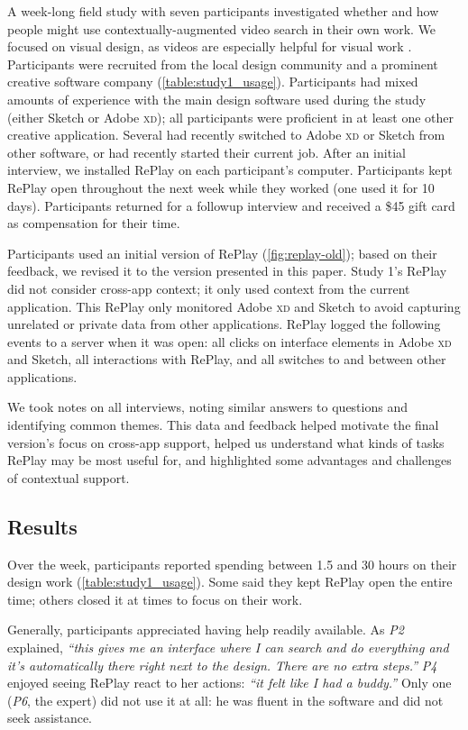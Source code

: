 A week-long field study with seven participants investigated whether and how people might use contextually-augmented video search in their own work. We focused on visual design, as videos are especially helpful for visual work \cite{Chi2012}.  Participants were recruited from the local design community and a prominent creative software company (\autoref{table:study1_usage}). Participants had mixed amounts of experience with the main design software used during the study (either Sketch or Adobe \textsc{xd}); all participants were proficient in at least one other creative application. Several had recently switched to Adobe \textsc{xd} or Sketch from other software, or had recently started their current job. After an initial interview, we installed RePlay on each participant's computer. Participants kept RePlay open throughout the next week while they worked (one used it for 10 days). Participants returned for a followup interview and received a \$45 gift card as compensation for their time. 

Participants used an initial version of RePlay (\autoref{fig:replay-old}); based on their feedback, we revised it to the version presented in this paper. Study 1's RePlay did not consider cross-app context; it only used context from the current application. This RePlay only monitored Adobe \textsc{xd} and Sketch to avoid capturing unrelated or private data from other applications. RePlay logged the following events to a server when it was open: all clicks on interface elements in Adobe \textsc{xd} and Sketch, all interactions with RePlay, and all switches to and between other applications.

We took notes on all interviews, noting similar answers to questions and identifying common themes. This data and feedback helped motivate the final version's focus on cross-app support, helped us understand what kinds of tasks RePlay may be most useful for, and highlighted some advantages and challenges of contextual support.

\subsection{Results}
Over the week, participants reported spending between 1.5 and 30 hours on their design work (\autoref{table:study1_usage}). Some said they kept RePlay open the entire time; others closed it at times to focus on their work. 

Generally, participants appreciated having help readily available. As \textit{P2} explained, \textit{``this gives me an interface where I can search and do everything and it's automatically there right next to the design. There are no extra steps.''} \textit{P4} enjoyed seeing RePlay react to her actions: \textit{``it felt like I had a buddy.''} Only one (\textit{P6}, the expert) did not use it at all: he was fluent in the software and did not seek assistance.

